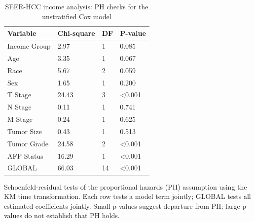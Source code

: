 \begin{table}[!htbp]
\centering
\small
\caption{SEER-HCC income analysis: PH checks for the unstratified Cox model}
\begin{tabular}{llll}
\toprule
Variable & Chi-square & DF & P-value \\
\midrule
Income Group & 2.97 & 1 & 0.085 \\
Age & 3.35 & 1 & 0.067 \\
Race & 5.67 & 2 & 0.059 \\
Sex & 1.65 & 1 & 0.200 \\
T Stage & 24.43 & 3 & \textless{}0.001 \\
N Stage & 0.11 & 1 & 0.741 \\
M Stage & 0.24 & 1 & 0.625 \\
Tumor Size & 0.43 & 1 & 0.513 \\
Tumor Grade & 24.58 & 2 & \textless{}0.001 \\
AFP Status & 16.29 & 1 & \textless{}0.001 \\
GLOBAL & 66.03 & 14 & \textless{}0.001 \\
\bottomrule
\end{tabular}
\begin{minipage}{0.95\linewidth}
\vspace{0.5em}
\footnotesize Schoenfeld-residual tests of the proportional hazards (PH) assumption using the KM time transformation. Each row tests a model term jointly; GLOBAL tests all estimated coefficients jointly. Small p-values suggest departure from PH; large p-values do not establish that PH holds.
\end{minipage}
\end{table}
